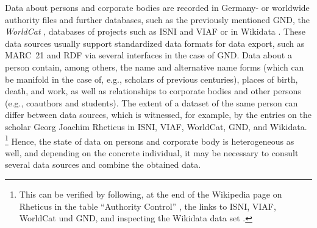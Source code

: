 Data about persons and corporate bodies are recorded
in Germany- or worldwide authority files and further databases,
such as the previously mentioned GND,
the \emph{WorldCat} \autocite{WorldCat},
databases of projects such as ISNI \autocite{ISNI}
and VIAF \autocite{VIAF}
or in Wikidata \autocite{Wikidata}.
These data sources usually support standardized data formats for data export,
such as MARC~21 and RDF via several interfaces in the case of GND.
Data about a person contain, among others, the name and alternative name forms
(which can be manifold in the case of, e.g., scholars of previous centuries),
places of birth, death, and work,
as well as relationships to corporate bodies and other persons
(e.g., coauthors and students).
The extent of a dataset of the same person can differ between data sources,
which is witnessed, for example, by the entries on the scholar
Georg Joachim Rheticus in ISNI, VIAF, WorldCat, GND, and Wikidata.%
\footnote{%
  This can be verified by following,
  at the end of the Wikipedia page on Rheticus
  in the table \enquote{Authority Control}
  \autocite{WikiRheticusExternalLinks},
  the links to ISNI, VIAF, WorldCat und GND,
  and inspecting the Wikidata data set
  \autocite{WikidataRheticus}.
}
Hence, the state of data on persons and corporate body is heterogeneous as well,
and depending on the concrete individual, it may be necessary
to consult several data sources and combine the obtained data.

